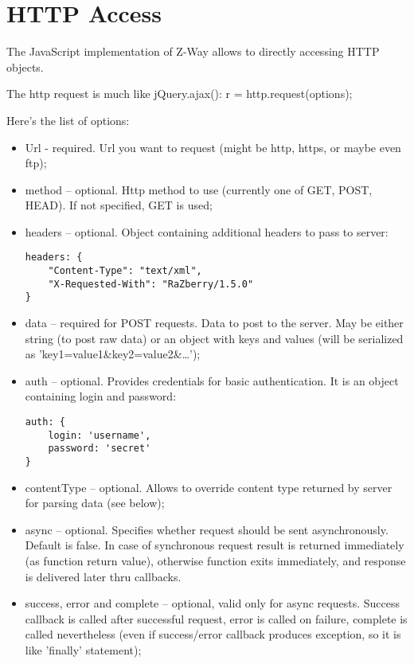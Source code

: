 \section{HTTP Access}

The JavaScript implementation of Z-Way allows to directly accessing HTTP objects.

The http request is much like jQuery.ajax(): r = http.request(options);

Here's the list of options:
\begin{itemize}
\item Url - required. Url you want to request (might be http, https, or maybe even ftp);
\item method – optional. Http method to use (currently one of GET, POST, HEAD). If not 
specified, GET is used;
\item headers – optional. Object containing additional headers to pass to server:

\begin{lstlisting}
headers: {
    "Content-Type": "text/xml",
    "X-Requested-With": "RaZberry/1.5.0"
}
\end{lstlisting}

\item data – required for POST requests. Data to post to the server. May be either 
string (to post raw data) or an object with keys and values (will be serialized as 
'key1=value1\&key2=value2\&…');
\item auth – optional. Provides credentials for basic authentication. It is an object 
containing login and password:
\begin{lstlisting}
auth: {
    login: 'username',
    password: 'secret'
}
\end{lstlisting}
\item contentType – optional. Allows to override content type returned by server for 
parsing data (see below);
\item async – optional. Specifies whether request should be sent asynchronously. Default 
is false. In case of synchronous request result is returned immediately (as function 
return value), otherwise function exits immediately, and response is delivered later 
thru callbacks.
\item success, error and complete – optional, valid only for async requests. Success 
callback is called after successful request, error is called on failure, complete is 
called nevertheless (even if success/error callback produces exception, so it is like 
'finally' statement);
\end{itemize}

